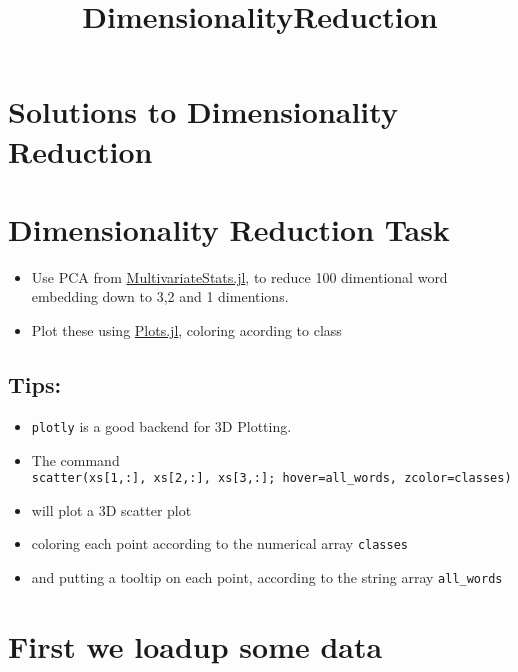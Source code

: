 \documentclass[11pt]{article}
\title{DimensionalityReduction}
\providecommand{\tightlist}{%
      \setlength{\itemsep}{0pt}\setlength{\parskip}{0pt}}
\begin{document}
    
    
    \maketitle
    
    

    
    \section{Solutions to Dimensionality
Reduction}\label{solutions-to-dimensionality-reduction}

\section{Dimensionality Reduction
Task}\label{dimensionality-reduction-task}

\begin{itemize}
\tightlist
\item
  Use PCA from
  \href{https://github.com/JuliaStats/MultivariateStats.jl}{MultivariateStats.jl},
  to reduce 100 dimentional word embedding down to 3,2 and 1 dimentions.
\item
  Plot these using
  \href{https://github.com/tbreloff/Plots.jl}{Plots.jl}, coloring
  acording to class
\end{itemize}

\subsection{Tips:}\label{tips}

\begin{itemize}
\tightlist
\item
  \texttt{plotly} is a good backend for 3D Plotting.
\item
  The command
  \texttt{scatter(xs{[}1,:{]},\ xs{[}2,:{]},\ xs{[}3,:{]};\ hover=all\_words,\ zcolor=classes)}
\item
  will plot a 3D scatter plot
\item
  coloring each point according to the numerical array \texttt{classes}
\item
  and putting a tooltip on each point, according to the string array
  \texttt{all\_words}
\end{itemize}

    \section{First we loadup some data}\label{first-we-loadup-some-data}
\end{document}
